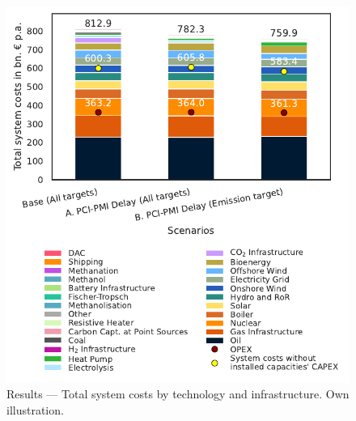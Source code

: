 \documentclass[final,5p,times,twocolumn]{elsarticle}
\begin{document}
\begin{figure}[!b]
  \centering
  \includegraphics[width=\linewidth]{system_costs}
  \caption{Results --- Total system costs by technology and infrastructure. Own illustration.}
  \label{fig:system_costs}
\end{figure}
\end{document}
